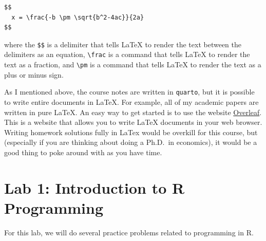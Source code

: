 \documentclass[
  letterpaper,
  DIV=11,
  numbers=noendperiod]{scrreprt}
\begin{document}
\begin{verbatim}
$$
  x = \frac{-b \pm \sqrt{b^2-4ac}}{2a}
$$
\end{verbatim}

where the \texttt{\$\$} is a delimiter that tells LaTeX to render the
text between the delimiters as an equation,
\texttt{\textbackslash{}frac} is a command that tells LaTeX to render
the text as a fraction, and \texttt{\textbackslash{}pm} is a command
that tells LaTeX to render the text as a plus or minus sign.

As I mentioned above, the course notes are written in \texttt{quarto},
but it is possible to write entire documents in LaTeX. For example, all
of my academic papers are written in pure LaTeX. An easy way to get
started is to use the website \href{http://www.overleaf.com}{Overleaf}.
This is a website that allows you to write LaTeX documents in your web
browser. Writing homework solutions fully in LaTex would be overkill for
this course, but (especially if you are thinking about doing a Ph.D.~in
economics), it would be a good thing to poke around with as you have
time.

\section{Lab 1: Introduction to R
Programming}\label{lab-1-introduction-to-r-programming}

For this lab, we will do several practice problems related to
programming in R.
\end{document}
